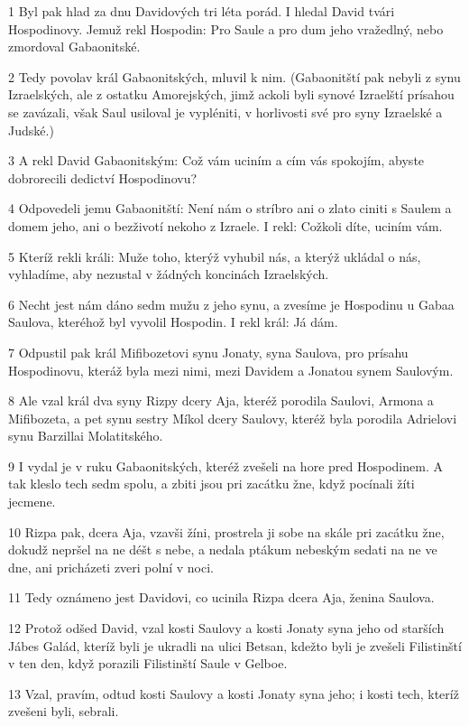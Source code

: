 \par 1 Byl pak hlad za dnu Davidových tri léta porád. I hledal David tvári Hospodinovy. Jemuž rekl Hospodin: Pro Saule a pro dum jeho vražedlný, nebo zmordoval Gabaonitské.
\par 2 Tedy povolav král Gabaonitských, mluvil k nim. (Gabaonitští pak nebyli z synu Izraelských, ale z ostatku Amorejských, jimž ackoli byli synové Izraelští prísahou se zavázali, však Saul usiloval je vypléniti, v horlivosti své pro syny Izraelské a Judské.)
\par 3 A rekl David Gabaonitským: Což vám uciním a cím vás spokojím, abyste dobrorecili dedictví Hospodinovu?
\par 4 Odpovedeli jemu Gabaonitští: Není nám o stríbro ani o zlato ciniti s Saulem a domem jeho, ani o bezživotí nekoho z Izraele. I rekl: Cožkoli díte, uciním vám.
\par 5 Kteríž rekli králi: Muže toho, kterýž vyhubil nás, a kterýž ukládal o nás, vyhladíme, aby nezustal v žádných koncinách Izraelských.
\par 6 Necht jest nám dáno sedm mužu z jeho synu, a zvesíme je Hospodinu u Gabaa Saulova, kteréhož byl vyvolil Hospodin. I rekl král: Já dám.
\par 7 Odpustil pak král Mifibozetovi synu Jonaty, syna Saulova, pro prísahu Hospodinovu, kteráž byla mezi nimi, mezi Davidem a Jonatou synem Saulovým.
\par 8 Ale vzal král dva syny Rizpy dcery Aja, kteréž porodila Saulovi, Armona a Mifibozeta, a pet synu sestry Míkol dcery Saulovy, kteréž byla porodila Adrielovi synu Barzillai Molatitského.
\par 9 I vydal je v ruku Gabaonitských, kteréž zvešeli na hore pred Hospodinem. A tak kleslo tech sedm spolu, a zbiti jsou pri zacátku žne, když pocínali žíti jecmene.
\par 10 Rizpa pak, dcera Aja, vzavši žíni, prostrela ji sobe na skále pri zacátku žne, dokudž nepršel na ne déšt s nebe, a nedala ptákum nebeským sedati na ne ve dne, ani pricházeti zveri polní v noci.
\par 11 Tedy oznámeno jest Davidovi, co ucinila Rizpa dcera Aja, ženina Saulova.
\par 12 Protož odšed David, vzal kosti Saulovy a kosti Jonaty syna jeho od starších Jábes Galád, kteríž byli je ukradli na ulici Betsan, kdežto byli je zvešeli Filistinští v ten den, když porazili Filistinští Saule v Gelboe.
\par 13 Vzal, pravím, odtud kosti Saulovy a kosti Jonaty syna jeho; i kosti tech, kteríž zvešeni byli, sebrali.
